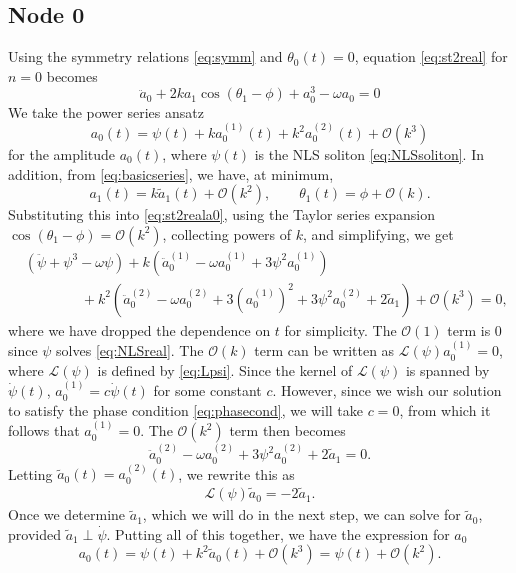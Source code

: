 \documentclass[11pt,reqno]{amsart}
\def\calL{{\mathcal L}}
\begin{document}
\subsection{Node 0}

Using the symmetry relations \cref{eq:symm} and $\theta_0(t) = 0$, equation \cref{eq:st2real} for $n=0$ becomes
\begin{equation}\label{eq:st2reala0}
\ddot a_0  + 2 k a_1 \cos(\theta_1 - \phi) + a_0^3 - \omega a_0 = 0 
\end{equation}
We take the power series ansatz 
\[
a_0(t) = \psi(t) + k a_0^{(1)}(t) + k^2 a_0^{(2)}(t) + \mathcal{O}(k^3)
\]
for the amplitude $a_0(t)$, where $\psi(t)$ is the NLS soliton \cref{eq:NLSsoliton}. In addition, from \cref{eq:basicseries}, we have, at minimum, 
\[
a_1(t) = k \tilde{a}_1(t) + \mathcal{O}(k^2), \qquad \theta_1(t) = \phi + \mathcal{O}(k).
\]
Substituting this into \cref{eq:st2reala0}, using the Taylor series expansion $\cos(\theta_1-\phi) = \mathcal{O}(k^2)$, collecting powers of $k$, and simplifying, we get
\begin{equation*}
\begin{aligned}
&\left(\ddot{\psi} + \psi^3 - \omega \psi\right) 
+ k\left(\ddot a_0^{(1)} - \omega a_0^{(1)} + 3 \psi^2 a_0^{(1)}\right) \\
&\qquad\qquad+ k^2\left(\ddot a_0^{(2)} - \omega a_0^{(2)} + 3\left(a_0^{(1)}\right)^2 + 3 \psi^2 a_0^{(2)} + 2 \tilde{a}_1 \right) + \mathcal{O}(k^3) = 0,
\end{aligned}
\end{equation*}
where we have dropped the dependence on $t$ for simplicity. The $\mathcal{O}(1)$ term is 0 since $\psi$ solves \cref{eq:NLSreal}. The $\mathcal{O}(k)$ term can be written as $\calL(\psi)a_0^{(1)}=0$, where $\calL(\psi)$ is defined by \cref{eq:Lpsi}. Since the kernel of $\calL(\psi)$ is spanned by $\dot \psi(t)$, $a_0^{(1)} = c \dot \psi(t)$ for some constant $c$. However, since we wish our solution to satisfy the phase condition \cref{eq:phasecond}, we will take $c = 0$, from which it follows that $a_0^{(1)} = 0$. The $\mathcal{O}(k^2)$ term then becomes
\[
\ddot a_0^{(2)} - \omega a_0^{(2)} + 3 \psi^2 a_0^{(2)} + 2 \tilde{a}_1 = 0.
\]
Letting $\tilde{a}_0(t) = a_0^{(2)}(t)$, we rewrite this as
\begin{align}\label{eq:solvea0ta}
\calL(\psi) \tilde{a}_0 = -2 \tilde{a}_1.
\end{align}
Once we determine $\tilde{a}_1$, which we will do in the next step, we can solve for $\tilde{a}_0$, provided $\tilde{a}_1 \perp \dot\psi$. Putting all of this together, we have the expression for $a_0$
\begin{equation}\label{eq:a0eq}
a_0(t) = \psi(t) + k^2 \tilde{a}_0(t) + \mathcal{O}(k^3) = \psi(t) + \mathcal{O}(k^2).
\end{equation}
\end{document}
